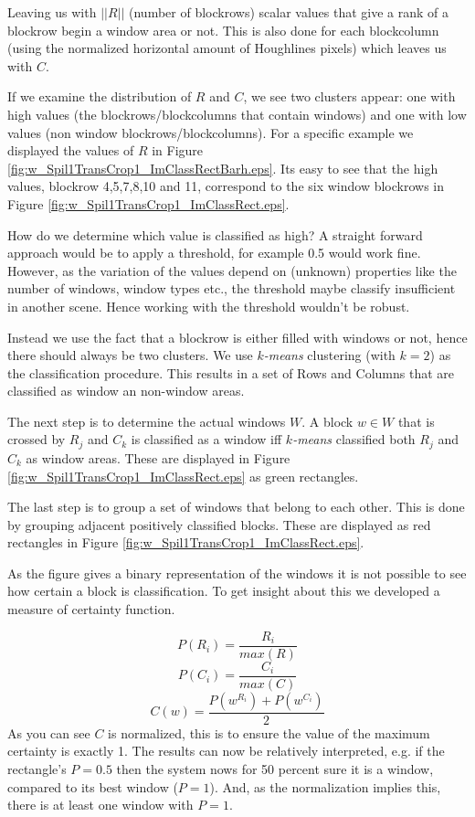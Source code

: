 Leaving us with $||R||$ (number of blockrows) scalar values that give a rank of a blockrow begin a window area or not.
This is also done for each blockcolumn (using the normalized horizontal amount of
Houghlines pixels) which leaves us with $C$.

If we examine the distribution of $R$ and $C$, we see two clusters appear: one with
high values (the blockrows/blockcolumns that contain windows) and one with low values (non window
blockrows/blockcolumns). For a specific example we displayed the values of $R$ in Figure \ref{fig:w_Spil1TransCrop1_ImClassRectBarh.eps}.
Its easy to see that the high values, blockrow 4,5,7,8,10 and 11, correspond to the
six window blockrows in Figure \ref{fig:w_Spil1TransCrop1_ImClassRect.eps}.

How do we determine which value is classified as high?  A straight forward
approach would be to apply a threshold, for example 0.5 would work fine.
However, as the variation of the values depend on (unknown) properties like the
number of windows, window types etc., the threshold maybe classify insufficient
in another scene.  Hence working with the threshold wouldn't be robust. 

Instead we use the fact that a blockrow is either filled with windows or not, hence
there should always be two clusters.  We use \emph{$k$-means} clustering (with
$k=2$) as the classification procedure.
This results in a set of Rows and Columns that are classified as window an
non-window areas.

The next step is to determine the actual windows $W$.
A block $w\in W$ that is crossed by $R_j$ and $C_k$ is classified as a
window iff \emph{$k$-means} classified both $R_j$ and $C_k$ as window areas. These are displayed in 
 Figure \ref{fig:w_Spil1TransCrop1_ImClassRect.eps} as green rectangles.

The last step is to group a set of windows that belong to each other. This is done by 
grouping adjacent positively classified blocks. These are displayed as red
rectangles in Figure \ref{fig:w_Spil1TransCrop1_ImClassRect.eps}.

As the figure gives a binary representation of the windows it is not possible
to see how certain a block is classification.
To get insight about this we developed a measure of certainty function.

\[P(R_i) = \frac{R_i}{max(R)}\]
\[P(C_i) = \frac{C_i}{max(C)}\]
\[C(w) = \frac{P(w^{R_i}) + P(w^{C_i})}{2}\]
As you can see $C$ is normalized, this is to ensure the value of the maximum
certainty is exactly 1. The results can now be relatively interpreted, e.g. if the rectangle's $P=0.5$
then the system nows for 50 percent sure it is a window, compared to its best window ($P=1$). 
And, as the normalization implies this, there is at least one window with $P=1$. 


